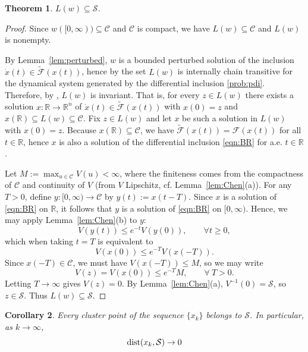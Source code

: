 \documentclass[pdflatex,sn-mathphys-num]{sn-jnl}%
\newcommand\dist{\mathop{\rm dist}}
\newcommand\R{\mathbb{R}}
\newcommand\C{\mathcal{C}}
\newcommand\mF{\mathcal{F}}
\newcommand\tmF{\widetilde{\mF}}
\newcommand\mS{\mathcal{S}}
\theoremstyle{thmstyleone}%
\newtheorem{theorem}{Theorem}%
\newtheorem{corollary}[theorem]{Corollary}%
\theoremstyle{thmstyletwo}%
\theoremstyle{thmstylethree}%
\begin{document}
\begin{theorem}\label{thm:limitset}
  $L(w) \subseteq \mS$.
\end{theorem}
\begin{proof}
Since $w([0,\infty))\subseteq \C$ and $\C$ is compact, we have $L(w)\subseteq \C$ and $L(w)$ is nonempty.

By Lemma~\ref{lem:perturbed}, $w$ is a bounded perturbed solution of the inclusion
$\dot x(t) \in \tmF(x(t))$, hence by \cite[Theorem~3.6]{Benaim2005} the set $L(w)$ is internally
chain transitive \cite[Definition VI]{Benaim2005} for the dynamical system generated by the differential inclusion \eqref{prob:pdi}. Therefore, by \cite[Lemma~3.5]{Benaim2005}, $L(w)$ is invariant. That is, for every
$z\in L(w)$ there exists a solution $x:\R\to\R^n$ of $\dot x(t)\in\tmF(x(t))$ with
$x(0)=z$ and $x(\R)\subseteq L(w)\subseteq \C$. Fix $z\in L(w)$ and let $x$ be such a solution in $L(w)$ with $x(0)=z$.
Because $x(\R)\subseteq\C$, we have $\tmF(x(t))=\mF(x(t))$ for all $t \in \R$, hence $x$ is also
a solution of the differential inclusion \eqref{eqn:BR} for a.e. $t \in \R$.

Let $M:=\max_{u\in \C} V(u)<\infty$, where the finiteness comes from the compactness of $\C$ and continuity of $V$ (from $V$ Lipschitz, cf. Lemma~\ref{lem:Chen}(a)).
For any $T>0$, define $y:[0,\infty)\to\C$ by $y(t):=x(t-T)$. Since $x$ is a solution of \eqref{eqn:BR} on $\R$, it follows that $y$ is a solution of
\eqref{eqn:BR} on $[0,\infty)$. Hence, we may apply Lemma~\ref{lem:Chen}(b) to $y$:
\[
  V(y(t)) \leq e^{-t} V(y(0)),\qquad\forall t \geq 0,
\]
which when taking $t = T$ is equivalent to
\[
  V(x(0)) \leq e^{-T}V(x(-T)).
\]
Since $x(-T)\in\C$, we must have $V(x(-T))\leq M$, so we may write
\[
V(z) = V(x(0)) \leq e^{-T} M, \qquad \forall\ T>0.
\]
Letting $T\to\infty$ gives $V(z)=0$. By Lemma~\ref{lem:Chen}(a), $V^{-1}(0)=\mS$, so
$z\in\mS$.
Thus $L(w)\subseteq \mS$.
\end{proof}

\begin{corollary} \label{cor:cluster}
Every cluster point of the sequence $\{x_k\}$ belongs to $\mS$. In particular, as $k \to \infty$,
\[
  \dist(x_k,\mS) \to 0
\]
\end{corollary}
\end{document}
